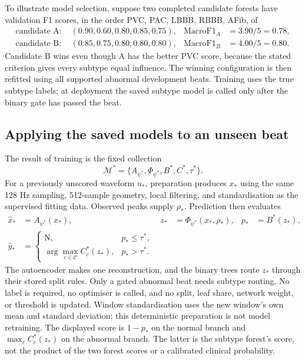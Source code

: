 To illustrate model selection, suppose two completed candidate forests have
validation F1 scores, in the order PVC, PAC, LBBB, RBBB, AFib, of
\begin{align}
 \text{candidate A: }&(0.90,0.60,0.80,0.85,0.75),
 &\operatorname{MacroF1}_A&=3.90/5=0.78,\\
 \text{candidate B: }&(0.85,0.75,0.80,0.80,0.80),
 &\operatorname{MacroF1}_B&=4.00/5=0.80.
 \label{eq:method-example-subtype-selection}
\end{align}
Candidate B wins even though A has the better PVC score, because the stated
criterion gives every subtype equal influence. The winning configuration is
then refitted using all supported abnormal development beats. Training uses
the true subtype labels; at deployment the saved subtype model is called
only after the binary gate has passed the beat.

\subsection{Applying the saved models to an unseen beat}

The result of training is the fixed collection
\begin{equation}
 \mathcal{M}^*=\{A_{\psi^*},\Phi_{\psi^*},B^*,C^*,\tau^*\}.
 \label{eq:method-saved-model-collection}
\end{equation}
For a previously unscored waveform $u_*$, preparation produces $x_*$ using
the same 128 Hz sampling, 512-sample geometry, local filtering, and
standardisation as the supervised fitting data. Observed peaks supply
$\rho_*$. Prediction then evaluates
\begin{align}
 \widehat x_*&=A_{\psi^*}(x_*),&
 z_*&=\Phi_{\psi^*}(x_*,\rho_*),& p_*&=B^*(z_*),\\
 \widehat y_*&=
 \begin{cases}
 \mathrm{N},&p_*\leq\tau^*,\\
 \displaystyle\arg\max_{c\in\mathcal{C}} C_c^*(z_*),&p_*>\tau^*.
 \end{cases}
 \label{eq:method-unseen-inference}
\end{align}
The autoencoder makes one reconstruction, and the binary trees route $z_*$
through their stored split rules. Only a gated abnormal beat needs subtype
routing. No label is required, no optimiser is called, and no split, leaf
share, network weight, or threshold is updated. Window standardisation uses
the new window's own mean and standard deviation; this deterministic
preparation is not model retraining. The displayed score is $1-p_*$ on the
normal branch and $\max_c C_c^*(z_*)$ on the abnormal branch. The latter is
the subtype forest's score, not the product of the two forest scores or a
calibrated clinical probability.

